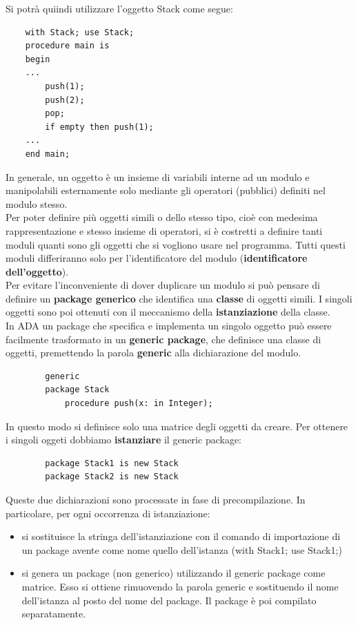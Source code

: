 \documentclass{article}
\begin{document}
	Si potrà quiindi utilizzare l'oggetto Stack come segue:
	\begin{verbatim}
	with Stack; use Stack;
	procedure main is
	begin
	...
	    push(1);
	    push(2);
	    pop;
	    if empty then push(1);
	...
	end main;
	\end{verbatim}
	In generale, un oggetto è un insieme di variabili interne ad un modulo e manipolabili esternamente solo mediante gli operatori (pubblici) definiti nel modulo stesso. \\
	Per poter definire più oggetti simili o dello stesso tipo, cioè con medesima rappresentazione e stesso insieme di operatori, si è costretti a definire tanti moduli quanti sono gli oggetti che si vogliono usare nel programma. Tutti questi moduli differiranno solo per l'identificatore del modulo (\textbf{identificatore dell'oggetto}). \\
	Per evitare l'inconveniente di dover duplicare un modulo si può pensare di definire un \textbf{package generico} che identifica una \textbf{classe} di oggetti simili. I singoli oggetti sono poi ottenuti con il meccanismo della \textbf{istanziazione} della classe.
	\vspace{\baselineskip} \\
	In ADA un package che specifica e implementa un singolo oggetto può essere facilmente trasformato in un \textbf{generic package}, che definisce una classe di oggetti, premettendo la parola \textbf{generic} alla dichiarazione del modulo.
	\begin{verbatim}
		generic
		package Stack 
			procedure push(x: in Integer);
	\end{verbatim}
	In questo modo si definisce solo una matrice degli oggetti da creare. Per ottenere i singoli oggeti dobbiamo \textbf{istanziare} il generic package:
	\begin{verbatim}
		package Stack1 is new Stack
		package Stack2 is new Stack
	\end{verbatim}
	Queste due dichiarazioni sono processate in fase di precompilazione. In particolare, per ogni occorrenza di istanziazione:
	\begin{itemize}
		\item si sostituisce la stringa dell'istanziazione con il comando di importazione di un package avente come nome quello dell'istanza (with Stack1; use Stack1;)
		\item si genera un package (non generico) utilizzando il generic package come matrice. Esso si ottiene rimuovendo la parola generic e sostituendo il nome dell'istanza al posto del nome del package. Il package è poi compilato separatamente.
	\end{itemize}
\end{document}
